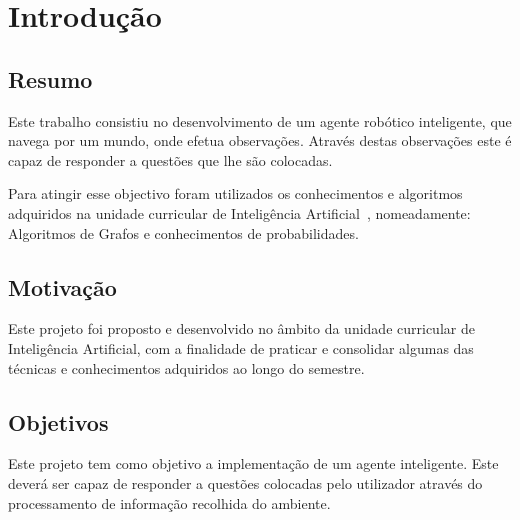\section{Introdução}
\label{chap:intro}

\subsection{Resumo}
\label{sec:amb}

Este trabalho consistiu no desenvolvimento de um agente robótico inteligente, que navega por um mundo, onde efetua observações. Através destas observações este é capaz de responder a questões que lhe são colocadas.

Para atingir esse objectivo foram utilizados os conhecimentos e algoritmos adquiridos na unidade curricular de Inteligência Artificial~\cite{livro}, nomeadamente: Algoritmos de Grafos e conhecimentos de probabilidades.

\subsection{Motivação}
\label{sec:mot}

Este projeto foi proposto e desenvolvido no âmbito da unidade curricular de Inteligência Artificial, com a finalidade de praticar e consolidar algumas das técnicas e conhecimentos adquiridos ao longo do semestre.

\subsection{Objetivos}
\label{sec:obj}

Este projeto tem como objetivo a implementação de um agente inteligente. Este deverá ser capaz de responder a questões colocadas pelo utilizador através do processamento de informação recolhida do ambiente.

